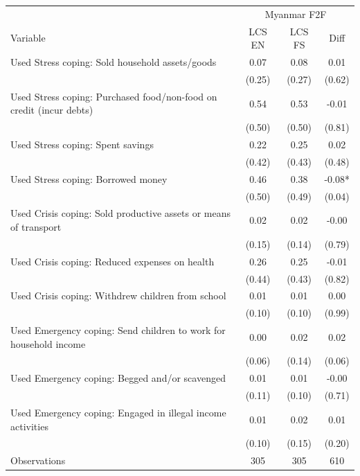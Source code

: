 \begin{tabular}{l*{3}c}
\hline\hline
 & \multicolumn{3}{c}{Myanmar F2F}\\ 
Variable & LCS EN & LCS FS & Diff \\
\hline
Used Stress coping: Sold household assets/goods&0.07&0.08&0.01\\
&(0.25)&(0.27)&(0.62)\\
Used Stress coping: Purchased food/non-food on credit (incur debts)&0.54&0.53&-0.01\\
&(0.50)&(0.50)&(0.81)\\
Used Stress coping: Spent savings&0.22&0.25&0.02\\
&(0.42)&(0.43)&(0.48)\\
Used Stress coping: Borrowed money&0.46&0.38&-0.08*\\
&(0.50)&(0.49)&(0.04)\\
Used Crisis coping: Sold productive assets or means of transport&0.02&0.02&-0.00\\
&(0.15)&(0.14)&(0.79)\\
Used Crisis coping: Reduced expenses on health&0.26&0.25&-0.01\\
&(0.44)&(0.43)&(0.82)\\
Used Crisis coping: Withdrew children from school&0.01&0.01&0.00\\
&(0.10)&(0.10)&(0.99)\\
Used Emergency coping: Send children to work for household income&0.00&0.02&0.02\\
&(0.06)&(0.14)&(0.06)\\
Used Emergency coping: Begged and/or scavenged&0.01&0.01&-0.00\\
&(0.11)&(0.10)&(0.71)\\
Used Emergency coping: Engaged in illegal income activities&0.01&0.02&0.01\\
&(0.10)&(0.15)&(0.20)\\
\hline
Observations & 305 & 305 & 610 \\
\hline\hline
\end{tabular}
